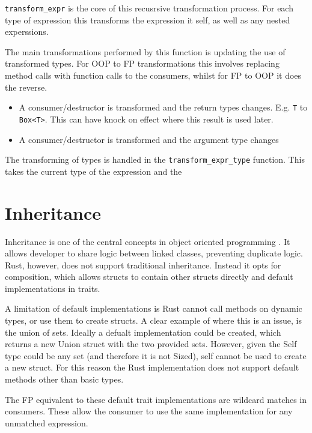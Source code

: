 \documentclass[ oneside,%
                    author={James Elgar},
                    degree={MEng},
                     title={Bidirectional transformer between functional and \\ object-oriented programming in Rust},
                  subtitle={}]{dissertation}
\begin{document}
\verb|transform_expr| is the core of this recusrsive transformation process. For each type of expression this transforms the expression it self, as well as any nested experssions.

The main transformations performed by this function is updating the use of transformed types. For OOP to FP transformations this involves replacing method calls with function calls to the consumers, whilst for FP to OOP it does the reverse. 

\begin{itemize}
    \item A consumer/destructor is transformed and the return types changes. E.g. \verb|T| to \verb|Box<T>|. This can have knock on effect where this result is used later.
    \item A consumer/destructor is transformed and the argument type changes
\end{itemize}

The transforming of types is handled in the \verb|transform_expr_type| function. This takes the current type of the expression and the 


\section{Inheritance}
\label{sec:inheritance}

Inheritance is one of the central concepts in object oriented programming \cite{cook_palsberg_1989}. It allows developer to share logic between linked classes, preventing duplicate logic. Rust, however, does not support traditional inheritance. Instead it opts for composition, which allows structs to contain other structs directly and default implementations in traits.

A limitation of default implementations is Rust cannot call methods on dynamic types, or use them to create structs.
A clear example of where this is an issue, is the union of sets. Ideally a defualt implementation could be created, which returns a new Union struct with the two provided sets. However, given the Self type could be any set (and therefore it is not Sized), self cannot be used to create a new struct. For this reason the Rust implementation does not support default methods other than basic types.

The FP equivalent to these default trait implementations are wildcard matches in consumers. These allow the consumer to use the same implementation for any unmatched expression.
\end{document}
